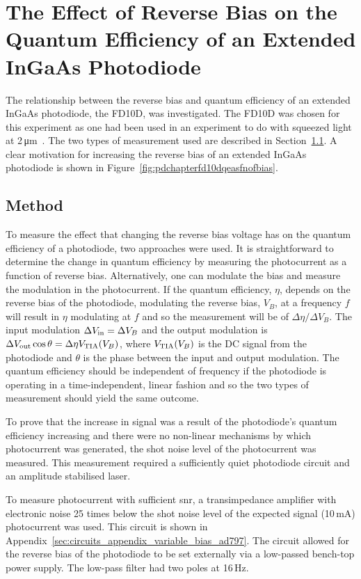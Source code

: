 \section{The Effect of Reverse Bias on the Quantum Efficiency of an Extended InGaAs Photodiode}
\label{sec:pd_chapter_reverse_bias_qe}
The relationship between the reverse bias and quantum efficiency of an extended InGaAs photodiode, the FD10D, was investigated. The FD10D was chosen for this experiment as one had been used in an experiment to do with squeezed light at 2\,\si{\micro\metre}~\cite{Mansell2018a}. The two types of measurement used are described in Section~\ref{sec:pd_chapter_qe_method}. A clear motivation for increasing the reverse bias of an extended InGaAs photodiode is shown in Figure~\ref{fig:pdchapterfd10dqeasfnofbias}.
\subsection{Method}
\label{sec:pd_chapter_qe_method}
\par
To measure the effect that changing the reverse bias voltage has on the quantum efficiency of a photodiode, two approaches were used. It is straightforward to determine the change in quantum efficiency by measuring the photocurrent as a function of reverse bias. Alternatively, one can modulate the bias and measure the modulation in the photocurrent. If the quantum efficiency, $\eta$, depends on the reverse bias of the photodiode, modulating the reverse bias, $V_B$, at a frequency $f$ will result in $\eta$ modulating at $f$ and so the measurement will be of $\Delta\eta/\Delta V_B$. The input modulation $\Delta V_{\rm{in}} = \Delta V_B$ and the output modulation is $\Delta V_{\rm{out}}\cos\theta = \Delta \eta V_{\rm{TIA}}(V_B)$, where $V_{\rm{TIA}}(V_B)$ is the DC signal from the photodiode and $\theta$ is the phase between the input and output modulation. The quantum efficiency should be independent of frequency if the photodiode is operating in a time-independent, linear fashion and so the two types of measurement should yield the same outcome.
\par
To prove that the increase in signal was a result of the photodiode's quantum efficiency increasing and there were no non-linear mechanisms by which photocurrent was generated, the shot noise level of the photocurrent was measured. This measurement required a sufficiently quiet photodiode circuit and an amplitude stabilised laser.
\par
To measure photocurrent with sufficient \gls{snr}, a transimpedance amplifier with electronic noise 25 times below the shot noise level of the expected signal (10\,mA) photocurrent was used. This circuit is shown in Appendix~\ref{sec:circuits_appendix_variable_bias_ad797}. The circuit allowed for the reverse bias of the photodiode to be set externally via a low-passed bench-top power supply. The low-pass filter had two poles at 16\,Hz.
